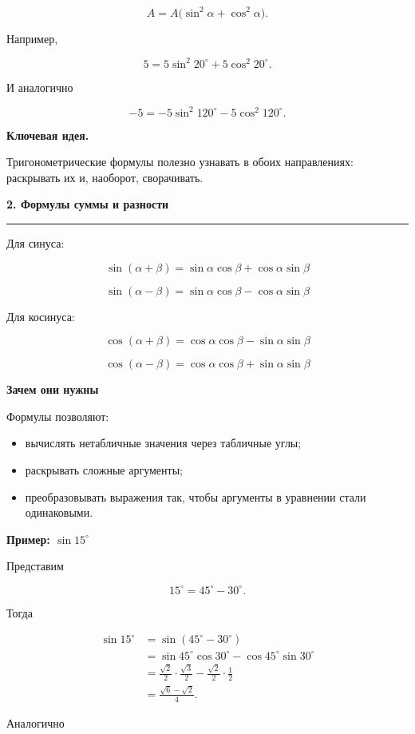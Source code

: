 \documentclass[a4paper,12pt]{article}
\newcommand{\maintitle}[1]{%
  {\Large\bfseries\color{darkaccent}#1\par}
  \vspace{0.5em}
  {\color{accent}\rule{\linewidth}{0.7pt}\par}
  \vspace{0.8em}
}
\newcommand{\subheading}[1]{%
  \vspace{0.7em}
  {\large\bfseries\color{darkaccent}#1\par}
  \vspace{0.25em}
}
\newcommand{\important}[1]{%
  \par\noindent
  {\bfseries\color{darkaccent}#1}
}
\begin{document}
\[
A
=
A\bigl(\sin^2\alpha+\cos^2\alpha\bigr).
\]

Например,

\[
5
=
5\sin^2 20^\circ+5\cos^2 20^\circ.
\]

И аналогично

\[
-5
=
-5\sin^2 120^\circ-5\cos^2 120^\circ.
\]

\important{Ключевая идея.}
Тригонометрические формулы полезно узнавать в обоих направлениях:
раскрывать их и, наоборот, сворачивать.

\maintitle{2. Формулы суммы и разности}

Для синуса:

\[
\boxed{
\sin(\alpha+\beta)
=
\sin\alpha\cos\beta+
\cos\alpha\sin\beta
}
\]

\[
\boxed{
\sin(\alpha-\beta)
=
\sin\alpha\cos\beta-
\cos\alpha\sin\beta
}
\]

Для косинуса:

\[
\boxed{
\cos(\alpha+\beta)
=
\cos\alpha\cos\beta-
\sin\alpha\sin\beta
}
\]

\[
\boxed{
\cos(\alpha-\beta)
=
\cos\alpha\cos\beta+
\sin\alpha\sin\beta
}
\]

\subheading{Зачем они нужны}

Формулы позволяют:

\begin{itemize}
  \item вычислять нетабличные значения через табличные углы;
  \item раскрывать сложные аргументы;
  \item преобразовывать выражения так, чтобы аргументы в уравнении стали одинаковыми.
\end{itemize}

\subheading{Пример: \(\sin 15^\circ\)}

Представим

\[
15^\circ=45^\circ-30^\circ.
\]

Тогда

\[
\begin{aligned}
\sin 15^\circ
&=
\sin(45^\circ-30^\circ)
\\
&=
\sin45^\circ\cos30^\circ
-
\cos45^\circ\sin30^\circ
\\
&=
\frac{\sqrt2}{2}\cdot\frac{\sqrt3}{2}
-
\frac{\sqrt2}{2}\cdot\frac12
\\
&=
\frac{\sqrt6-\sqrt2}{4}.
\end{aligned}
\]

Аналогично
\end{document}

